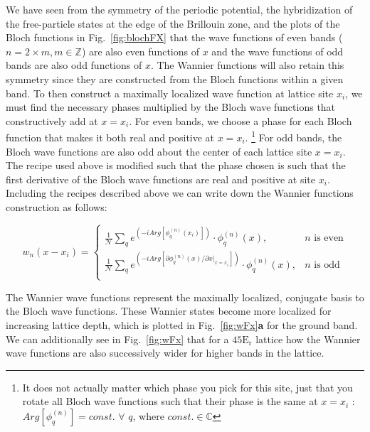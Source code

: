 We have seen from the symmetry of the periodic potential, the hybridization of the free-particle states at the edge of the Brillouin zone, and the plots of the Bloch functions in Fig.~\ref{fig:blochFX} that the wave functions of even bands ($ n = 2\times m, m\in \mathbb{Z}$) are also even functions of $x$ and the wave functions of odd bands are also odd functions of $x$. The Wannier functions will also retain this symmetry since they are constructed from the Bloch functions within a given band. To then construct a maximally localized wave function at lattice site $x_i$, we must find the necessary phases multiplied by the Bloch wave functions that constructively add at $x=x_i$. For even bands, we choose a phase for each Bloch function that makes it both real and positive at $x=x_i$. \footnote{It does not actually matter which phase you pick for this site, just that you rotate all Bloch wave functions such that their phase is the same at $x=x_i$ : $Arg \left [ \phi_q^{(n)} \right ] = const.$ $\forall$ $q$, where $const. \in \mathbb{C}$} For odd bands, the Bloch wave functions are also odd about the center of each lattice site $x=x_i$. The recipe used above is modified such that the phase chosen is such that the first derivative of the Bloch wave functions are real and positive at site $x_i$. Including the recipes described above we can write down the Wannier functions construction as follows:


\begin{equation}
\label{eqn:wFx}
w_n(x-x_i) = \left \{
\begin{array}{ll}
   \frac{1}{\mathcal{N}} \sum_q e^{\left ( - i Arg [ \phi_q^{(n)} (x_i) ] \right )} \cdot \phi_q^{(n)} (x), & n\mathrm{\text{ is even}}\\
   \frac{1}{\mathcal{N}} \sum_q e^{\left ( - i Arg [ \partial \phi_q^{(n)} (x)/ \partial x |_{x=x_i} ] \right )} \cdot \phi_q^{(n)} (x), & n \mathrm{\text{ is odd}}\\
\end{array} 
\right .
\end{equation}

The Wannier wave functions represent the maximally localized, conjugate basis to the Bloch wave functions. These Wannier states become more localized for increasing lattice depth, which is plotted in Fig.~\ref{fig:wFx}\textbf{a} for the ground band. We can additionally see in Fig.~\ref{fig:wFx} that for a $45 \mathrm{E_r}$ lattice how the Wannier wave functions are also successively wider for higher bands in the lattice. 

